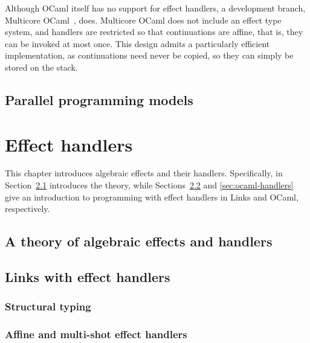 \documentclass[mscres,cdtppar,twoside,openright,logo,rightchapter,normalheadings]{infthesis}
\theoremstyle{definition}
\newcommand{\todo}[1]{{\par\noindent\small\color{red} \framebox{\parbox{\dimexpr\linewidth-2\fboxsep-2\fboxrule}{\textbf{TODO:} #1}}}}
\begin{document}
Although OCaml itself has no support for effect handlers, a
development branch, Multicore OCaml~\cite{Dolan2015}, does. Multicore
OCaml does not include an effect type system, and handlers are
restricted so that continuations are affine, that is, they can be
invoked at most once. This design admits a particularly efficient
implementation, as continuations need never be copied, so they can
simply be stored on the stack.

\section{Parallel programming models}
\todo{\cite{Marlow2013}}



\chapter{Effect handlers}
\label{ch:background}
This chapter introduces algebraic effects and their
handlers. Specifically, in Section~\ref{sec:theory-handlers}
introduces the theory, while Sections~\ref{sec:links-handlers} and
\ref{sec:ocaml-handlers} give an introduction to programming with
effect handlers in Links and OCaml, respectively.

\section{A theory of algebraic effects and handlers}
\label{sec:theory-handlers}

\section{Links with effect handlers}
\label{sec:links-handlers}

\subsection{Structural typing}

\subsection{Affine and multi-shot effect handlers}
\label{sec:links-affine-multi}
\end{document}
